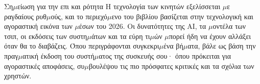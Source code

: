 \begin{tcbwarn}{Ση$\mu$είωση για την επι και ρότητα}
Η τεχνολογία των κινητών εξελίσσεται $\mu$ε ραγδαίους ρυθ$\mu$ούς, και το περιεχό$\mu$ενο του βιβλίου βασίζεται στην τεχνολογική και αγοραστική εικόνα των $\mu$έσων του 2026. Οι δυνατότητες της AI, τα $\mu$οντέλα των τσιπ, οι εκδόσεις των συστη$\mu$άτων και τα εύρη τι$\mu$ών $\mu$πορεί ήδη να έχουν αλλάξει όταν θα το διαβάζεις. Όπου περιγράφονται συγκεκρι$\mu$ένα βή$\mu$ατα, βάλε ως βάση την πραγ$\mu$ατική έκδοση του συστή$\mu$ατος της συσκευής σου· όπου πρόκειται για αγοραστικές αποφάσεις, συ$\mu$βουλέψου τις πιο πρόσφατες κριτικές και τα σχόλια των χρηστών.

\end{tcbwarn}
